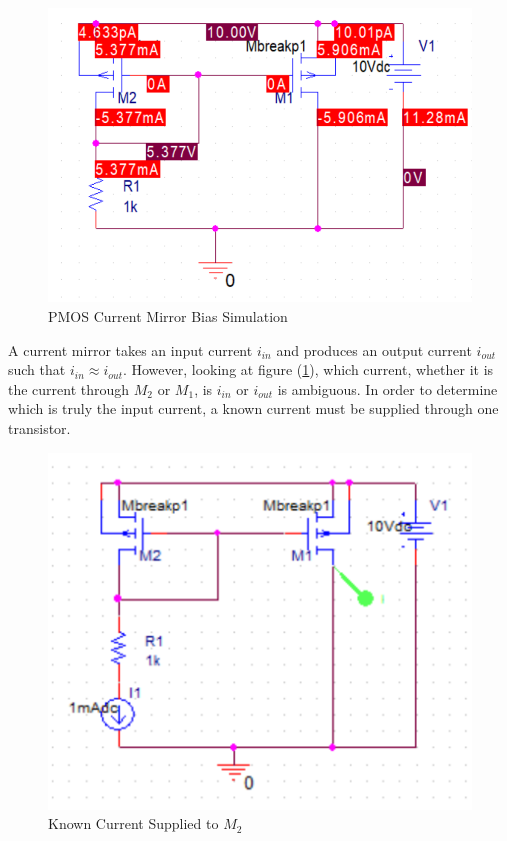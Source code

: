 \FloatBarrier

\begin{figure}[h!]
	\centering
	\includegraphics[scale=0.75]{../images/circuit1_bp.PNG}
	\caption{PMOS Current Mirror Bias Simulation}
	\label{fig:circuit1_bp}
\end{figure}

\FloatBarrier

A current mirror takes an input current $i_{in}$ and produces an output current $i_{out}$ such that $i_{in} \approx i_{out}$.
However, looking at figure (\ref{fig:circuit1_bp}), which current, whether it is the current through $M_2$ or $M_1$, is $i_{in}$ or $i_{out}$ is ambiguous.
In order to determine which is truly the input current, a known current must be supplied through one transistor.

\FloatBarrier

\begin{figure}[h!]
	\centering
	\includegraphics[scale=0.75]{../images/thought_exp1.PNG}
	\caption{Known Current Supplied to $M_2$}
	\label{fig:thought_exp1}
\end{figure}

